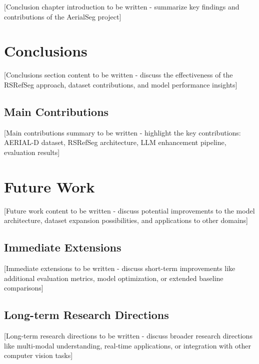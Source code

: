 \cleardoublepage
\label{chap:conclusion}

[Conclusion chapter introduction to be written - summarize key findings and contributions of the AerialSeg project]

\section{Conclusions}
[Conclusions section content to be written - discuss the effectiveness of the RSRefSeg approach, dataset contributions, and model performance insights]

\subsection{Main Contributions}
[Main contributions summary to be written - highlight the key contributions: AERIAL-D dataset, RSRefSeg architecture, LLM enhancement pipeline, evaluation results]

\section{Future Work}
[Future work content to be written - discuss potential improvements to the model architecture, dataset expansion possibilities, and applications to other domains]

\subsection{Immediate Extensions}
[Immediate extensions to be written - discuss short-term improvements like additional evaluation metrics, model optimization, or extended baseline comparisons]

\subsection{Long-term Research Directions}
[Long-term research directions to be written - discuss broader research directions like multi-modal understanding, real-time applications, or integration with other computer vision tasks]